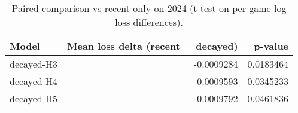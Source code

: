 \begin{table}

\caption{\label{tab:unnamed-chunk-4}Paired comparison vs recent-only on 2024 (t-test on per-game log loss differences).}
\centering
\begin{tabular}[t]{lrr}
\toprule
Model & Mean loss delta (recent − decayed) & p-value\\
\midrule
decayed-H3 & -0.0009284 & 0.0183464\\
decayed-H4 & -0.0009593 & 0.0345233\\
decayed-H5 & -0.0009792 & 0.0461836\\
\bottomrule
\end{tabular}
\end{table}
